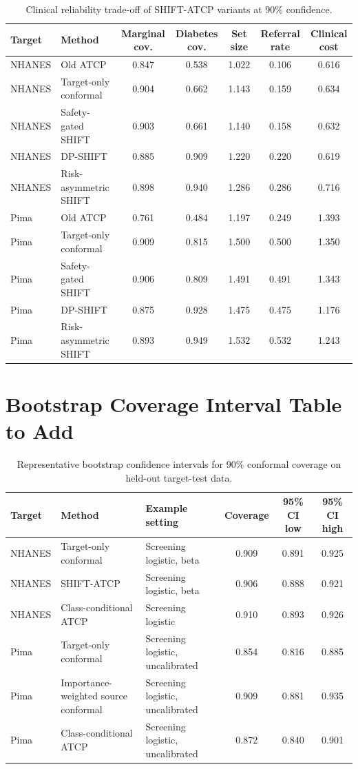 \documentclass[11pt]{article}
\begin{document}
\begin{table}[!t]
\centering
\caption{Clinical reliability trade-off of SHIFT-ATCP variants at 90\% confidence.}
\label{tab:clinical_tradeoff_insert}
\scriptsize
\begin{tabular}{llccccc}
\toprule
Target & Method & Marginal cov. & Diabetes cov. & Set size & Referral rate & Clinical cost \\
\midrule
NHANES & Old ATCP & 0.847 & 0.538 & 1.022 & 0.106 & 0.616 \\
NHANES & Target-only conformal & 0.904 & 0.662 & 1.143 & 0.159 & 0.634 \\
NHANES & Safety-gated SHIFT & 0.903 & 0.661 & 1.140 & 0.158 & 0.632 \\
NHANES & DP-SHIFT & 0.885 & 0.909 & 1.220 & 0.220 & 0.619 \\
NHANES & Risk-asymmetric SHIFT & 0.898 & 0.940 & 1.286 & 0.286 & 0.716 \\
\midrule
Pima & Old ATCP & 0.761 & 0.484 & 1.197 & 0.249 & 1.393 \\
Pima & Target-only conformal & 0.909 & 0.815 & 1.500 & 0.500 & 1.350 \\
Pima & Safety-gated SHIFT & 0.906 & 0.809 & 1.491 & 0.491 & 1.343 \\
Pima & DP-SHIFT & 0.875 & 0.928 & 1.475 & 0.475 & 1.176 \\
Pima & Risk-asymmetric SHIFT & 0.893 & 0.949 & 1.532 & 0.532 & 1.243 \\
\bottomrule
\end{tabular}
\end{table}

\section{Bootstrap Coverage Interval Table to Add}
\begin{table}[!t]
\centering
\caption{Representative bootstrap confidence intervals for 90\% conformal coverage on held-out target-test data.}
\label{tab:bootstrap_insert}
\scriptsize
\begin{tabular}{lllccc}
\toprule
Target & Method & Example setting & Coverage & 95\% CI low & 95\% CI high \\
\midrule
NHANES & Target-only conformal & Screening logistic, beta & 0.909 & 0.891 & 0.925 \\
NHANES & SHIFT-ATCP & Screening logistic, beta & 0.906 & 0.888 & 0.921 \\
NHANES & Class-conditional ATCP & Screening logistic & 0.910 & 0.893 & 0.926 \\
Pima & Target-only conformal & Screening logistic, uncalibrated & 0.854 & 0.816 & 0.885 \\
Pima & Importance-weighted source conformal & Screening logistic, uncalibrated & 0.909 & 0.881 & 0.935 \\
Pima & Class-conditional ATCP & Screening logistic, uncalibrated & 0.872 & 0.840 & 0.901 \\
\bottomrule
\end{tabular}
\end{table}
\end{document}
